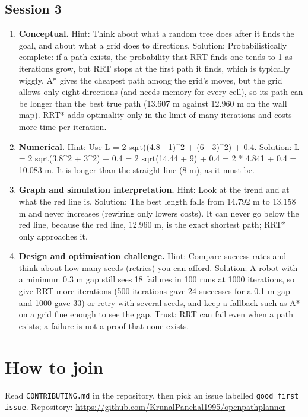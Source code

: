 \documentclass[11pt,a4paper]{article}
\begin{document}
\subsection*{Session 3}
\begin{enumerate}[nosep]
\item \textbf{Conceptual.} Hint: Think about what a random tree does after it finds the goal, and about what a grid does to directions. Solution: Probabilistically complete: if a path exists, the probability that RRT finds one tends to 1 as iterations grow, but RRT stops at the first path it finds, which is typically wiggly. A* gives the cheapest path among the grid's moves, but the grid allows only eight directions (and needs memory for every cell), so its path can be longer than the best true path (13.607 m against 12.960 m on the wall map). RRT* adds optimality only in the limit of many iterations and costs more time per iteration.
\item \textbf{Numerical.} Hint: Use L = 2 sqrt((4.8 - 1)\textasciicircum{}2 + (6 - 3)\textasciicircum{}2) + 0.4. Solution: L = 2 sqrt(3.8\textasciicircum{}2 + 3\textasciicircum{}2) + 0.4 = 2 sqrt(14.44 + 9) + 0.4 = 2 * 4.841 + 0.4 = 10.083 m. It is longer than the straight line (8 m), as it must be.
\item \textbf{Graph and simulation interpretation.} Hint: Look at the trend and at what the red line is. Solution: The best length falls from 14.792 m to 13.158 m and never increases (rewiring only lowers costs). It can never go below the red line, because the red line, 12.960 m, is the exact shortest path; RRT* only approaches it.
\item \textbf{Design and optimisation challenge.} Hint: Compare success rates and think about how many seeds (retries) you can afford. Solution: A robot with a minimum 0.3 m gap still sees 18 failures in 100 runs at 1000 iterations, so give RRT more iterations (500 iterations gave 24 successes for a 0.1 m gap and 1000 gave 33) or retry with several seeds, and keep a fallback such as A* on a grid fine enough to see the gap. Trust: RRT can fail even when a path exists; a failure is not a proof that none exists.
\end{enumerate}

\section{How to join}
Read \texttt{CONTRIBUTING.md} in the repository, then pick an issue labelled \texttt{good first issue}. Repository: \url{https://github.com/KrunalPanchal1995/openpathplanner}
\end{document}
